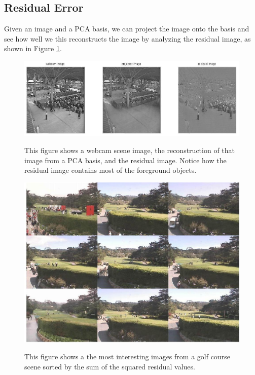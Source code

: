 \subsection{Residual Error}

Given an image and a PCA basis, we can project the image onto the basis and see how well we this reconstructs the image by analyzing the residual image, as shown in Figure \ref{fig:residualReconstruction}.

\begin{figure}
	\centering
		\includegraphics[width=1\textwidth]{figures/residualReconstruction.jpg}
	\label{fig:residualReconstruction}
	
		\caption[The reconstruction and residual of an image.]{This figure shows a webcam scene image, the reconstruction of that image from a PCA basis, and the residual image.  Notice how the residual image contains most of the foreground objects.}
\end{figure}

\begin{figure}
	\centering
		\includegraphics[width=1\textwidth]{figures/residualSSDmontage.jpg}
	\label{fig:residualSSDmontage}
	
		\caption[Sum Squared Residual Montage.]{This figure shows a the most interesting images from a golf course scene sorted by the sum of the squared residual values.}
\end{figure}

